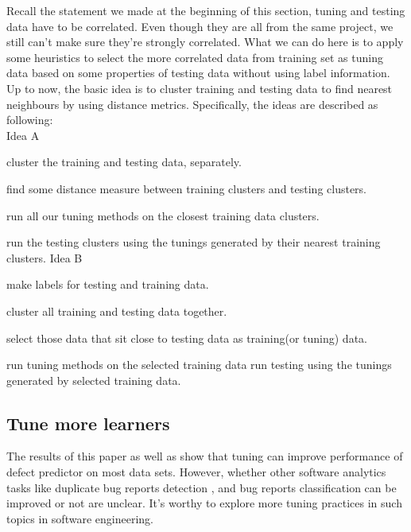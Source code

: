 Recall the statement we made at the beginning of this section, tuning and testing data have to be correlated.
Even though they are all from the same project, we still can't make sure they're strongly
correlated. What we can do here is to apply some heuristics to select the more correlated data from training set as tuning data based
on some properties of testing data without using label information. Up to now, the basic idea is to cluster
training and testing data to find nearest neighbours
by using distance metrics. Specifically, the ideas are described as following:\\
Idea A
\bi
\item cluster the training and testing data, separately.
\item find some distance measure between training clusters and testing clusters.
\item run all our tuning methods on the closest training data clusters.
\item run the testing clusters using the tunings generated by their nearest training clusters.
\ei
Idea B
\bi
\item make labels for testing and training data.
\item cluster all training and testing data together.
\item select those data that sit close to testing data as training(or tuning) data.
\item run tuning methods on the selected training data
run testing using the tunings generated by selected training data.
\ei


\subsection{Tune more learners}
The results of this paper as well as \cite{tantithamthavorn2016automated} show that tuning
can improve performance of defect predictor on most data
sets. However, whether other software analytics tasks like
duplicate bug reports detection \cite{sun2010discriminative,jalbert2008automated,alipour2013contextual,nguyen2012duplicate}, and bug reports classification \cite{antoniol2008bug,zanetti2013categorizing,lamkanfi2011comparing,tian2013drone} can be improved or not are unclear. It's worthy to explore more tuning practices in such topics in software engineering.

